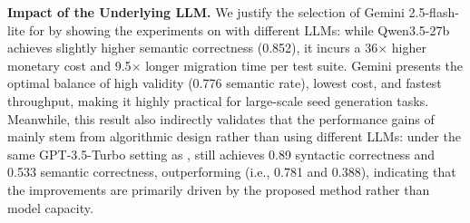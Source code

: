 \documentclass[sigconf,review,anonymous]{acmart}
\begin{document}
\begin{table}[b]
\centering
\small
\caption{Performance of \tool{} across different underlying LLMs. TS denotes Test Suite.}
\label{tab:llm_comparison}
\setlength{\tabcolsep}{2.5pt}
\end{table}

\textbf{Impact of the Underlying LLM.}
We justify the selection of Gemini 2.5-flash-lite for \tool{} by showing the experiments on \monetdb{} with different LLMs: while Qwen3.5-27b achieves slightly higher semantic correctness (0.852), it incurs a 36$\times$ higher monetary cost and 9.5$\times$ longer migration time per test suite. Gemini presents the optimal balance of high validity (0.776 semantic rate), lowest cost, and fastest throughput, making it highly practical for large-scale seed generation tasks.
Meanwhile, this result also indirectly validates that the performance gains of \tool{} mainly stem from algorithmic design rather than using different LLMs: under the same GPT-3.5-Turbo setting as \sedar{}, \tool{} still achieves 0.89 syntactic correctness and 0.533 semantic correctness, outperforming \sedar{} (i.e., 0.781 and 0.388), indicating that the improvements are primarily driven by the proposed method rather than model capacity.




\end{document}
